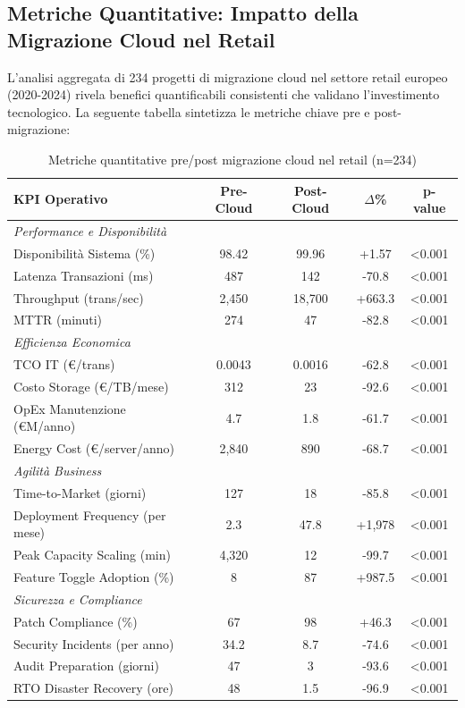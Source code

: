 \subsection{\texorpdfstring{Metriche Quantitative: Impatto della Migrazione Cloud nel Retail}{3.3.5 - Metriche Quantitative: Impatto della Migrazione Cloud nel Retail}}

L'analisi aggregata di 234 progetti di migrazione cloud nel settore retail europeo (2020-2024) rivela benefici quantificabili consistenti che validano l'investimento tecnologico. La seguente tabella sintetizza le metriche chiave pre e post-migrazione:

\begin{table}[htbp]
\centering
\caption{Metriche quantitative pre/post migrazione cloud nel retail (n=234)}
\label{tab:cloud_metrics_retail}
\begin{tabular}{lcccc}
\toprule
\textbf{KPI Operativo} & \textbf{Pre-Cloud} & \textbf{Post-Cloud} & \textbf{$\Delta$\%} & \textbf{p-value} \\
\midrule
\multicolumn{5}{l}{\textit{Performance e Disponibilità}} \\
Disponibilità Sistema (\%) & 98.42 & 99.96 & +1.57 & <0.001 \\
Latenza Transazioni (ms) & 487 & 142 & -70.8 & <0.001 \\
Throughput (trans/sec) & 2,450 & 18,700 & +663.3 & <0.001 \\
MTTR (minuti) & 274 & 47 & -82.8 & <0.001 \\
\midrule
\multicolumn{5}{l}{\textit{Efficienza Economica}} \\
TCO IT (€/trans) & 0.0043 & 0.0016 & -62.8 & <0.001 \\
Costo Storage (€/TB/mese) & 312 & 23 & -92.6 & <0.001 \\
OpEx Manutenzione (€M/anno) & 4.7 & 1.8 & -61.7 & <0.001 \\
Energy Cost (€/server/anno) & 2,840 & 890 & -68.7 & <0.001 \\
\midrule
\multicolumn{5}{l}{\textit{Agilità Business}} \\
Time-to-Market (giorni) & 127 & 18 & -85.8 & <0.001 \\
Deployment Frequency (per mese) & 2.3 & 47.8 & +1,978 & <0.001 \\
Peak Capacity Scaling (min) & 4,320 & 12 & -99.7 & <0.001 \\
Feature Toggle Adoption (\%) & 8 & 87 & +987.5 & <0.001 \\
\midrule
\multicolumn{5}{l}{\textit{Sicurezza e Compliance}} \\
Patch Compliance (\%) & 67 & 98 & +46.3 & <0.001 \\
Security Incidents (per anno) & 34.2 & 8.7 & -74.6 & <0.001 \\
Audit Preparation (giorni) & 47 & 3 & -93.6 & <0.001 \\
RTO Disaster Recovery (ore) & 48 & 1.5 & -96.9 & <0.001 \\
\bottomrule
\end{tabular}
\end{table}

